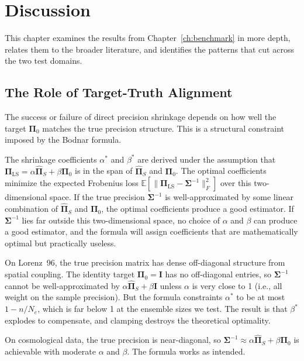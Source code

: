 \chapter{Discussion}
\label{ch:discussion}

This chapter examines the results from Chapter~\ref{ch:benchmark} in more depth, relates them to the broader literature, and identifies the patterns that cut across the two test domains.

\section{The Role of Target-Truth Alignment}
\label{sec:disc_alignment}

The success or failure of direct precision shrinkage depends on how well the target $\boldsymbol{\Pi}_0$ matches the true precision structure. This is a structural constraint imposed by the Bodnar formula.

The shrinkage coefficients $\alpha^*$ and $\beta^*$ are derived under the assumption that $\boldsymbol{\Pi}_{\text{LS}} = \alpha \hat{\boldsymbol{\Pi}}_S + \beta \boldsymbol{\Pi}_0$ is in the span of $\hat{\boldsymbol{\Pi}}_S$ and $\boldsymbol{\Pi}_0$. The optimal coefficients minimize the expected Frobenius loss $\mathbb{E}[\|\boldsymbol{\Pi}_{\text{LS}} - \boldsymbol{\Sigma}^{-1}\|_F^2]$ over this two-dimensional space. If the true precision $\boldsymbol{\Sigma}^{-1}$ is well-approximated by some linear combination of $\hat{\boldsymbol{\Pi}}_S$ and $\boldsymbol{\Pi}_0$, the optimal coefficients produce a good estimator. If $\boldsymbol{\Sigma}^{-1}$ lies far outside this two-dimensional space, no choice of $\alpha$ and $\beta$ can produce a good estimator, and the formula will assign coefficients that are mathematically optimal but practically useless.

On Lorenz~96, the true precision matrix has dense off-diagonal structure from spatial coupling. The identity target $\boldsymbol{\Pi}_0 = \mathbf{I}$ has no off-diagonal entries, so $\boldsymbol{\Sigma}^{-1}$ cannot be well-approximated by $\alpha \hat{\boldsymbol{\Pi}}_S + \beta \mathbf{I}$ unless $\alpha$ is very close to 1 (i.e., all weight on the sample precision). But the formula constraints $\alpha^*$ to be at most $1 - n/N_e$, which is far below 1 at the ensemble sizes we test. The result is that $\beta^*$ explodes to compensate, and clamping destroys the theoretical optimality.

On cosmological data, the true precision is near-diagonal, so $\boldsymbol{\Sigma}^{-1} \approx \alpha \hat{\boldsymbol{\Pi}}_S + \beta \boldsymbol{\Pi}_0$ is achievable with moderate $\alpha$ and $\beta$. The formula works as intended.

